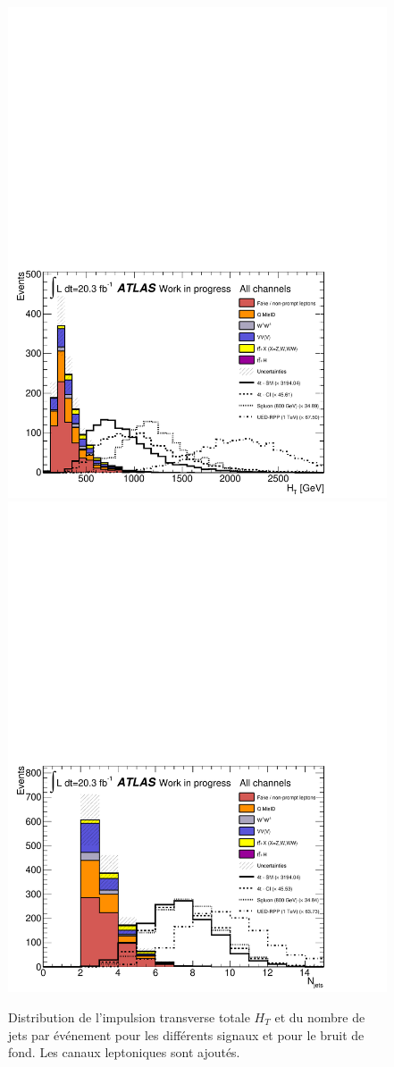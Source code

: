 \begin{figure}[!htb]
\begin{center}
\vspace*{-5cm}
\includegraphics[width=0.48\linewidth]{figures/STD_END_SELECTION_alladded_HT_alladded.pdf}
\includegraphics[width=0.48\linewidth]{figures/STD_END_SELECTION_alladded_Njets_alladded.pdf}
\end{center}
\vspace*{-0.5cm}
\caption{Distribution de l'impulsion transverse totale $H_T$ et du nombre de jets par \'ev\'enement pour les diff\'erents signaux \fourtop{} et pour le bruit de fond. Les canaux leptoniques sont ajout\'es.}
\label{fig:opt:cat:distrib_var_4tops}
\end{figure}

